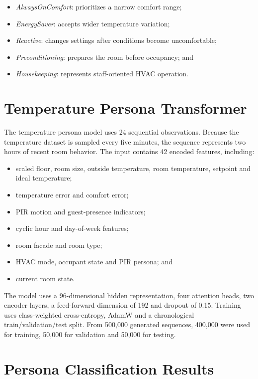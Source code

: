 \begin{itemize}
    \item \textit{AlwaysOnComfort}: prioritizes a narrow comfort range;
    \item \textit{EnergySaver}: accepts wider temperature variation;
    \item \textit{Reactive}: changes settings after conditions become
    uncomfortable;
    \item \textit{Preconditioning}: prepares the room before occupancy; and
    \item \textit{Housekeeping}: represents staff-oriented HVAC operation.
\end{itemize}

\section{Temperature Persona Transformer}

The temperature persona model uses 24 sequential observations. Because the
temperature dataset is sampled every five minutes, the sequence represents two
hours of recent room behavior. The input contains 42 encoded features,
including:

\begin{itemize}
    \item scaled floor, room size, outside temperature, room temperature,
    setpoint and ideal temperature;
    \item temperature error and comfort error;
    \item PIR motion and guest-presence indicators;
    \item cyclic hour and day-of-week features;
    \item room facade and room type;
    \item HVAC mode, occupant state and PIR persona; and
    \item current room state.
\end{itemize}

The model uses a 96-dimensional hidden representation, four attention heads,
two encoder layers, a feed-forward dimension of 192 and dropout of 0.15.
Training uses class-weighted cross-entropy, AdamW and a chronological
train/validation/test split. From 500,000 generated sequences, 400,000 were
used for training, 50,000 for validation and 50,000 for testing.

\section{Persona Classification Results}

